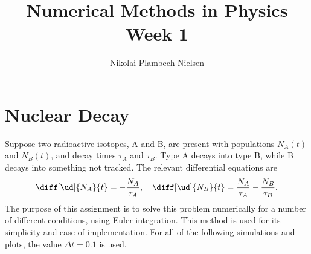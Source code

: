 \documentclass[a4paper,10pt]{article} 	%
\title{Numerical Methods in Physics Week 1}
\author{Nikolai Plambech Nielsen}
\date{}
\numberwithin{equation}{section}
\begin{document}
	\maketitle
	\section{Nuclear Decay}
	Suppose  two radioactive isotopes, A and B, are present with populations $ N_A(t) $ and $ N_B(t) $, and decay times $ \tau_A $  and $ \tau_B $. Type A decays into type B, while B decays into something not tracked. The relevant differential equations are
	\begin{equation}
		\diff[\ud]{N_A}{t} = - \frac{N_A}{\tau_A}, \quad \diff[\ud]{N_B}{t} = \frac{N_A}{\tau_A} - \frac{N_B}{\tau_B}.
	\end{equation}
	The purpose of this assignment is to solve this problem numerically for a number of different conditions, using Euler integration. This method is used for its simplicity and ease of implementation. For all of the following simulations and plots, the value $ \Delta t = 0.1 $ is used.
	
\end{document}
